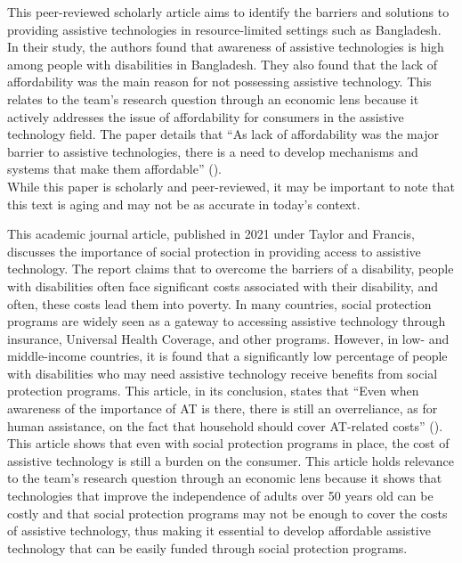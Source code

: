 This peer-reviewed scholarly article aims to identify the barriers and solutions to providing assistive technologies in resource-limited settings
          such as Bangladesh. In their study, the authors found that awareness of assistive technologies is high among people with disabilities in Bangladesh. They also
          found that the lack of affordability was the main reason for not possessing assistive technology. This relates to the team's research question through
          an economic lens because it actively addresses the issue of affordability for consumers in the assistive technology field. The paper details that 
          ``As lack of affordability was the major barrier to assistive technologies, there is a need to develop mechanisms and systems that make them affordable'' (\cite{doi:10.3109/17483107.2014.974221}).\\
          While this paper is scholarly and peer-reviewed, it may be important to note that this text is aging and may not be as accurate in today's context.

\pagebreak
{}

This academic journal article, published in 2021 under Taylor and Francis, discusses the importance of social protection in providing access to assistive technology. The report
          claims that to overcome the barriers of a disability, people with disabilities often face significant costs associated with their disability, and often, these costs lead them into poverty.
          In many countries, social protection programs are widely seen as a gateway to accessing assistive technology through insurance, Universal Health Coverage, and other programs.
          However, in low- and middle-income countries, it is found that a significantly low percentage of people with disabilities who may need assistive technology receive benefits from social protection programs.
          This article, in its conclusion, states that ``Even when awareness of the importance of AT is there, there is still an overreliance, as for human assistance, on the fact that household should cover AT-related costs'' (\cite{doi:10.1080/10400435.2021.1994052}).
          This article shows that even with social protection programs in place, the cost of assistive technology is still a burden on the consumer. This article holds relevance to the team's research question through an economic lens
          because it shows that technologies that improve the independence of adults over 50 years old can be costly and that social protection programs may not be enough to cover the costs of assistive technology, thus making it essential to develop affordable assistive technology that can be easily funded through
          social protection programs.

